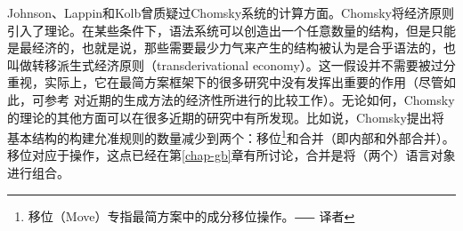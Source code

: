 \addlines[-1]
Johnson、Lappin和Kolb曾质疑过Chomsky系统的计算方面。Chomsky将经济原则引入了理论。在某些条件下，语法系统可以创造出一个任意数量的结构，但是只能是最经济的，也就是说，那些需要最少力气来产生的结构被认为是合乎语法的，也叫做转移派生式经济原则（transderivational economy）。这一假设并不需要被过分重视，实际上，它在最简方案框架下的很多研究中没有发挥出重要的作用（尽管如此，可参考 \citet{Richards2015a}对近期的生成方法的经济性所进行的比较工作）。无论如何，Chomsky的理论的其他方面可以在很多近期的研究中有所发现。比如说，Chomsky提出将基本结构的构建允准规则的数量减少到两个：移位\footnote{
移位（Move）专指最简方案中的成分移位操作。⸺ 译者}和合并（即内部和外部合并）。移位对应于\moveac 操作，这点已经在第\ref{chap-gb}章有所讨论，合并是将（两个）语言对象进行组合。

